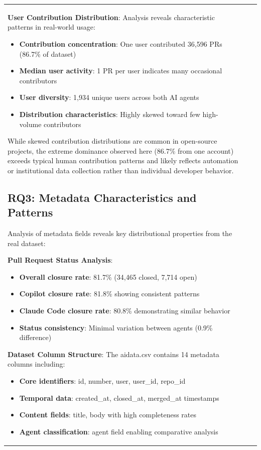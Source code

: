 \documentclass[conference]{IEEEtran}
\begin{document}
\begin{table}[t]
\begin{tabular}{@{}lrr@{}}
\textbf{User Contribution Distribution}: Analysis reveals characteristic patterns in real-world usage:
\begin{itemize}
    \item \textbf{Contribution concentration}: One user contributed 36,596 PRs (86.7\% of dataset)
    \item \textbf{Median user activity}: 1 PR per user indicates many occasional contributors
    \item \textbf{User diversity}: 1,934 unique users across both AI agents
    \item \textbf{Distribution characteristics}: Highly skewed toward few high-volume contributors
\end{itemize}

While skewed contribution distributions are common in open-source projects, the extreme dominance observed here (86.7\% from one account) exceeds typical human contribution patterns and likely reflects automation or institutional data collection rather than individual developer behavior.

\subsection{RQ3: Metadata Characteristics and Patterns}

Analysis of metadata fields reveals key distributional properties from the real dataset:

\textbf{Pull Request Status Analysis}: 
\begin{itemize}
    \item \textbf{Overall closure rate}: 81.7\% (34,465 closed, 7,714 open)
    \item \textbf{Copilot closure rate}: 81.8\% showing consistent patterns
    \item \textbf{Claude Code closure rate}: 80.8\% demonstrating similar behavior
    \item \textbf{Status consistency}: Minimal variation between agents (0.9\% difference)
\end{itemize}

\textbf{Dataset Column Structure}: The aidata.csv contains 14 metadata columns including:
\begin{itemize}
    \item \textbf{Core identifiers}: id, number, user, user\_id, repo\_id  
    \item \textbf{Temporal data}: created\_at, closed\_at, merged\_at timestamps
    \item \textbf{Content fields}: title, body with high completeness rates
    \item \textbf{Agent classification}: agent field enabling comparative analysis
\end{itemize}


\end{tabular}
\end{table}
\end{document}
